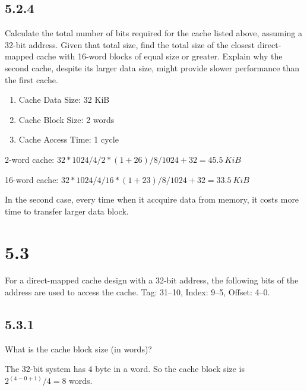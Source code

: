 \documentclass[paper=a4, fontsize=11pt]{scrartcl} %
\begin{document}
\subsection{5.2.4}
\begin{fancyquotes}
    Calculate the total number of bits required for the cache listed above, assuming a 32-bit address. Given that total size, find the total size of the closest direct-mapped cache with 16-word blocks of equal size or greater. Explain why the second cache, despite its larger data size, might provide slower performance than the first cache.
\end{fancyquotes}

\begin{enumerate}
    \item Cache Data Size: 32 KiB
    \item Cache Block Size: 2 words
    \item Cache Access Time: 1 cycle
\end{enumerate}

2-word cache: $32*1024/4/2*(1+26)/8/1024 + 32=\SI{45.5}{KiB}$

16-word cache: $32*1024/4/16*(1+23)/8/1024 + 32=\SI{33.5}{KiB}$

In the second case, every time when it accquire data from memory, it costs more time to transfer larger data block.

\pagebreak

\section{5.3}
\begin{fancyquotes}
    For a direct-mapped cache design with a 32-bit address, the following bits of the address are used to access the cache.
    Tag: 31--10, Index: 9--5, Offset: 4--0.
\end{fancyquotes}

\subsection{5.3.1} %
\label{sub:5_3_1}
\begin{fancyquotes}
    What is the cache block size (in words)?
\end{fancyquotes}

The $32$-bit system has $4$ byte in a word.
So the cache block size is $2^{(4-0+1)}/4=8$ words.
\end{document}
